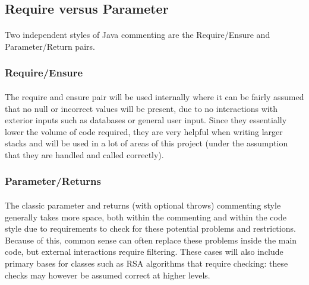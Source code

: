 \documentclass{article}
\begin{document}
	\subsection{Require versus Parameter}
	\paragraph{}
Two independent styles of Java commenting are the Require/Ensure and Parameter/Return pairs.

	\subsubsection{Require/Ensure}
	\paragraph{}
The require and ensure pair will be used internally where it can be fairly assumed that no null or incorrect values will be present, due to no interactions with exterior inputs such as databases or general user input. Since they essentially lower the volume of code required, they are very helpful when writing larger stacks and will be used in a lot of areas of this project (under the assumption that they are handled and called correctly).

	\subsubsection{Parameter/Returns}
	\paragraph{}
The classic parameter and returns (with optional throws) commenting style generally takes more space, both within the commenting and within the code style due to requirements to check for these potential problems and restrictions. Because of this, common sense can often replace these problems inside the main code, but external interactions require filtering. These cases will also include primary bases for classes such as RSA algorithms that require checking: these checks may however be assumed correct at higher levels.
\end{document}
